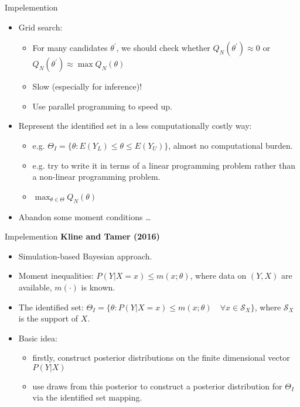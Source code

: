 \documentclass[aspectratio=169]{beamer}  %
\begin{document}
\begin{frame}{Impelemention}
    \begin{itemize}
        \item Grid search:
        \begin{itemize}
            \item For many candidates $\theta^{\prime}$, we should check whether  $Q_N(\theta^{\prime})\approx0$ or $Q_N(\theta^{\prime})\approx\max Q_N(\theta)$
            \item Slow (especially for inference)!
            \item Use parallel programming to speed up.
        \end{itemize}   
        \item Represent the identified set in a less computationally costly way:
        \begin{itemize}
            \item e.g. $\Theta_I=\{\theta:E(Y_L)\leq\theta\leq E(Y_U)\}$, almost no computational burden.
            \item e.g. try to write it in terms of a linear programming problem rather than a non-linear programming problem.
            \item $\max_{\theta\in\Theta}Q_N(\theta)$
        \end{itemize} 
        \item Abandon some moment conditions \ldots
    \end{itemize}
\end{frame}

\begin{frame}{Impelemention}
    \textbf{Kline and Tamer (2016)}
    \begin{itemize}
        \item Simulation-based Bayesian approach.
        \item Moment inequalities: $P(Y|X=x)\leq m(x;\theta)$, where data on $(Y, X)$ are available, $m(\cdot)$ is known.
        \item The identified set: $\Theta_I=\{\theta:P(Y|X=x)\leq m(x;\theta)\quad\forall x\in\mathcal{S}_X\}$, where $\mathcal{S}_X$ is the support of $X$.
        \item Basic idea: 
        \begin{itemize}
            \item firstly, construct posterior distributions on the finite dimensional vector $P(Y|X)$ 
            \item use draws from this posterior to construct a posterior distribution for $\Theta_I$ via the identified set mapping.
        \end{itemize}   
    \end{itemize}
\end{frame}
\end{document}
